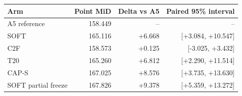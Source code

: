 \begin{tabular}{lrrr}
\toprule
Arm & Point MiD & Delta vs A5 & Paired 95\% interval \\
\midrule
A5 reference & 158.449 & -- & -- \\
SOFT & 165.116 & +6.668 & [+3.084, +10.547] \\
C2F & 158.573 & +0.125 & [-3.025, +3.432] \\
T20 & 165.260 & +6.812 & [+2.290, +11.514] \\
CAP-S & 167.025 & +8.576 & [+3.735, +13.630] \\
SOFT partial freeze & 167.826 & +9.378 & [+5.359, +13.272] \\
\bottomrule
\end{tabular}
